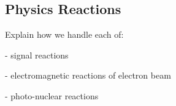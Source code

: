 
\subsection{Physics Reactions}

Explain how we handle each of: 

- signal reactions

- electromagnetic reactions of electron beam

- photo-nuclear reactions
